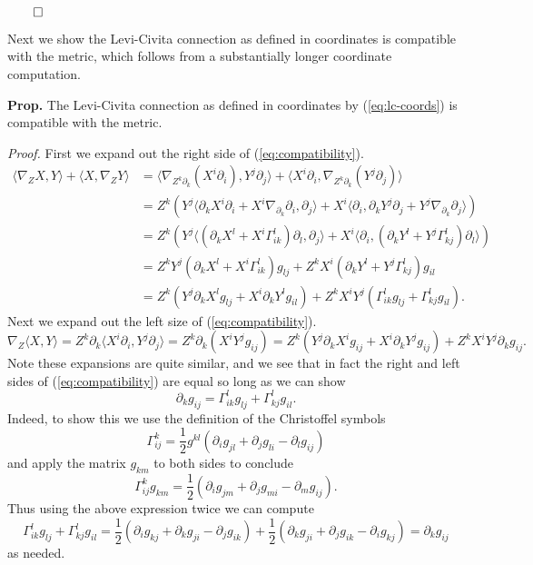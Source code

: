 \documentclass[
]{article}
\renewcommand{\square}{\hfill\qed}
\begin{document}
\(\square\)

Next we show the Levi-Civita connection as defined in coordinates is
compatible with the metric, which follows from a substantially longer
coordinate computation.

\textbf{Prop.} The Levi-Civita connection as defined in coordinates by
(\ref{eq:lc-coords}) is compatible with the metric.

\emph{Proof.} First we expand out the right side of
(\ref{eq:compatibility}). \begin{align}
    \langle \nabla_Z X , Y\rangle + \langle X , \nabla_Z Y\rangle
    &= \langle \nabla_{Z^k \partial_k}(X^i \partial_i) , Y^j\partial_j \rangle
    + \langle X^i \partial_i , \nabla_{Z^k \partial_k}(Y^j \partial_j)\rangle\\\
    &= Z^k(Y^j\langle \partial_k X^i\partial_i + X^i \nabla_{\partial_k}\partial
    _i , \partial_j\rangle
    + X^i\langle \partial_i , \partial_kY^j \partial_j + Y^j \nabla_{\partial_k}\partial_j\rangle)\\\
    &= Z^k(Y^j\langle (\partial_kX^l + X^i\Gamma_{ik}^l)\partial_l , \partial_j\rangle
    + X^i \langle \partial_i , (\partial_kY^l + Y^j\Gamma_{kj}^l)\partial_l\rangle)\\\
    &= Z^kY^j(\partial_kX^l + X^i\Gamma_{ik}^l)g_{lj}
    + Z^kX^i(\partial_kY^l + Y^j\Gamma_{kj}^l)g_{il}\\\
    &= Z^k(Y^j\partial_kX^lg_{lj} + X^i\partial_kY^l g_{il}) + Z^kX^iY^j(\Gamma_{ik}^lg_{lj} + \Gamma_{kj}^lg_{il}).
\end{align} Next we expand out the left size of
(\ref{eq:compatibility}). \[
    \nabla_Z\langle X , Y\rangle
    = Z^k \partial_k\langle X^i \partial_i , Y^j \partial_j\rangle
    = Z^k \partial_k(X^i Y^j g_{ij})
    = Z^k(Y^j\partial_kX^ig_{ij} + X^i\partial_kY^jg_{ij})
    + Z^kX^iY^j\partial_kg_{ij}.
\] Note these expansions are quite similar, and we see that in fact the
right and left sides of (\ref{eq:compatibility}) are equal so long as we
can show \[
    \partial_kg_{ij} = \Gamma_{ik}^lg_{lj} + \Gamma_{kj}^lg_{il}.
\] Indeed, to show this we use the definition of the Christoffel symbols
\[
    \Gamma_{ij}^k = \frac{1}{2}g^{kl}(\partial_ig_{jl} + \partial_jg_{li} - \partial_lg_{ij})
\] and apply the matrix \(g_{km}\) to both sides to conclude \[
    \Gamma_{ij}^k g_{km} = \frac{1}{2}(\partial_ig_{jm} + \partial_jg_{mi} - \partial_mg_{ij}).
\] Thus using the above expression twice we can compute \[
    \Gamma_{ik}^lg_{lj} + \Gamma_{kj}^lg_{il}
    = \frac{1}{2}(\partial_ig_{kj} + \partial_kg_{ji} - \partial_jg_{ik})
    + \frac{1}{2}(\partial_kg_{ji} + \partial_jg_{ik} - \partial_ig_{kj})
    = \partial_kg_{ij}
\] as needed.
\end{document}
